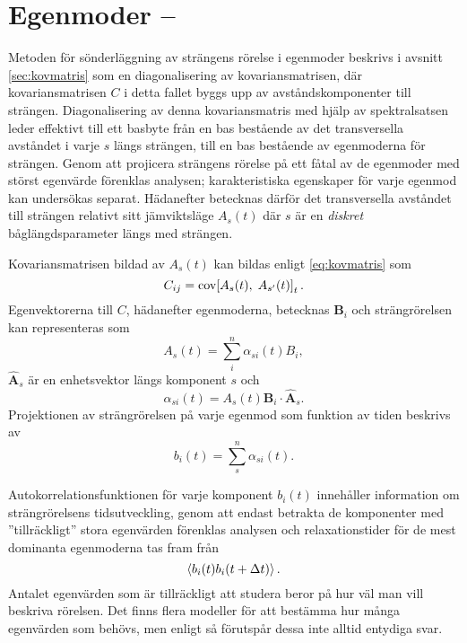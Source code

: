 \section{Egenmoder -- }


Metoden för sönderläggning av strängens rörelse i egenmoder beskrivs i avsnitt \ref{sec:kovmatris} som en diagonalisering av kovariansmatrisen, där kovariansmatrisen $C$ i detta fallet byggs upp av avståndskomponenter till strängen. %
Diagonalisering av denna kovariansmatris med hjälp av spektralsatsen leder effektivt till ett basbyte från en bas bestående av det transversella avståndet i varje $s$ längs strängen, till en bas bestående av egenmoderna för strängen. %
Genom att projicera strängens rörelse på ett fåtal av de egenmoder med störst egenvärde förenklas analysen\cite{Shlens_PCA2014}; karakteristiska egenskaper för varje egenmod kan undersökas separat. Hädanefter betecknas därför det transversella avståndet till strängen relativt sitt jämviktsläge $A_s(t)$ där $s$ är en \emph{diskret} båglängdsparameter längs med strängen.

Kovariansmatrisen bildad av $A_s(t)$ kan bildas enligt \eqref{eq:kovmatris} som 
\begin{equation}
\label{eq:C}
    C_{ij} = \text{cov}\!\left[A_s(t),\;A_{s'}(t)\right]_t.
\end{equation}
Egenvektorerna till $C$, hädanefter egenmoderna, betecknas $\mathbf{B}_i$ och strängrörelsen kan representeras som
\begin{equation}
    A_s(t) = \sum_i^n \alpha_{si}(t)B_i,
\end{equation}
$\hat{\mathbf{A}}_s$ är en enhetsvektor längs komponent $s$ och 
\begin{equation}
    \alpha_{si}(t) = A_s(t)\mathbf{B}_i\cdot\hat{\mathbf{A}}_s.
\end{equation}
Projektionen av strängrörelsen på varje egenmod som funktion av tiden beskrivs av
\begin{equation}
    b_i(t) = \sum_s^n \alpha_{si}(t).
\end{equation}

Autokorrelationsfunktionen för varje komponent $b_i(t)$ innehåller information om strängrörelsens tidsutveckling, genom att endast betrakta de komponenter med ''tillräckligt'' stora egenvärden förenklas analysen och relaxationstider för de mest dominanta egenmoderna tas fram från 
\begin{equation}
    \ev{b_i(t)b_i(t+\Delta t)}.
\end{equation}
Antalet egenvärden som är tillräckligt att studera beror på hur väl man vill beskriva rörelsen. Det finns flera modeller för att bestämma hur många egenvärden som behövs, men enligt \cite{Cangelosi2007} så förutspår dessa inte alltid entydiga svar. 

